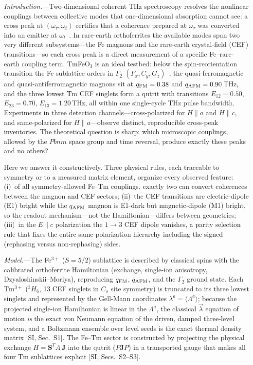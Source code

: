 \documentclass[aps,prl,twocolumn,superscriptaddress,longbibliography]{revtex4-2}
\newcommand{\ve}[1]{\boldsymbol{#1}}
\newcommand{\qafm}{q_{\rm AFM}}
\newcommand{\qfm}{q_{\rm FM}}
\begin{document}
\emph{Introduction.}---Two-dimensional coherent THz spectroscopy resolves
the nonlinear couplings between collective modes that one-dimensional
absorption cannot see: a cross peak at $(\omega_\tau,\omega_t)$ certifies
that a coherence prepared at $\omega_\tau$ was converted into an emitter
at $\omega_t$~\cite{Lu2017,Mukamel}.  In rare-earth orthoferrites the
available modes span two very different subsystems---the Fe magnons and
the rare-earth crystal-field (CEF) transitions---so each cross peak is a
direct measurement of a specific Fe--rare-earth coupling term.  TmFeO$_3$
is an ideal testbed: below the spin-reorientation transition the Fe
sublattice orders in $\Gamma_2$ $(F_x,C_y,G_z)$~\cite{Yamaguchi,
Kimel2004,Zhang2016}, the quasi-ferromagnetic and quasi-antiferromagnetic
magnons sit at $\qfm=0.38$ and $\qafm=0.90$\,THz, and the three lowest Tm
CEF singlets form a qutrit with transitions $E_{12}=0.50$,
$E_{23}=0.70$, $E_{13}=1.20$\,THz, all within one single-cycle THz pulse
bandwidth.  Experiments in three detection channels---cross-polarized for
$H\!\parallel\!a$ and $H\!\parallel\!c$, and same-polarized for
$H\!\parallel\!a$---observe distinct, reproducible cross-peak
inventories.  The theoretical question is sharp: which microscopic
couplings, allowed by the $Pbnm$ space group and time reversal, produce
exactly these peaks and no others?

Here we answer it constructively.  Three physical rules, each traceable
to symmetry or to a measured matrix element, organize every observed
feature: (i)~of all symmetry-allowed Fe--Tm couplings, exactly two can
convert coherences between the magnon and CEF sectors; (ii)~the CEF
transitions are electric-dipole (E1) bright while the $\qafm$ magnon is
E1-dark but magnetic-dipole (M1) bright, so the readout mechanism---not
the Hamiltonian---differs between geometries; (iii)~in the
$E\!\parallel\!c$ polarization the $1\!\to\!3$ CEF dipole vanishes,
a parity selection rule that fixes the entire same-polarization
hierarchy including the signed (rephasing versus non-rephasing) sides.

\emph{Model.}---The Fe$^{3+}$ ($S=5/2$) sublattice is described by
classical spins with the calibrated orthoferrite Hamiltonian
(exchange, single-ion anisotropy, Dzyaloshinskii--Moriya), reproducing
$\qfm$, $\qafm$, and the $\Gamma_2$ ground state.  Each Tm$^{3+}$
($^3H_6$, 13 CEF singlets in $C_s$ site symmetry) is truncated to its
three lowest singlets and represented by the Gell-Mann coordinates
$\lambda^a=\langle\Lambda^a\rangle$; because the projected single-ion
Hamiltonian is linear in the $\Lambda^a$, the classical $\vec\lambda$
equation of motion \emph{is} the exact von Neumann equation of the driven,
damped three-level system, and a Boltzmann ensemble over level seeds is
the exact thermal density matrix [SI, Sec.~S1].  The Fe--Tm sector is
constructed by projecting the physical exchange
$H=\ve S^{T}\!A\,\ve J$ into the qutrit ($P\ve JP$) in a transported
gauge that makes all four Tm sublattices explicit [SI, Secs.~S2--S3].
\end{document}
